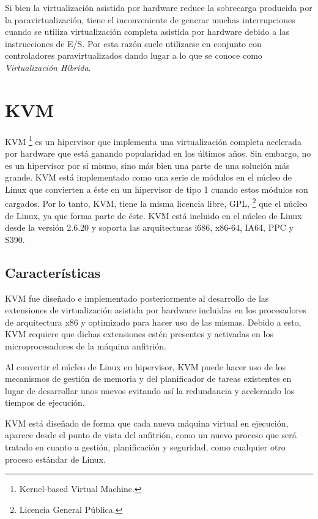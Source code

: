 \documentclass[spanisheDIVcalc,twoside,parskip-,pointlessnumbers,final]{scrbook}
\begin{document}
Si bien la virtualización asistida por hardware reduce la sobrecarga
producida por la paravirtualización, tiene el inconveniente de generar
muchas interrupciones cuando se utiliza virtualización completa asistida
por hardware debido a las instrucciones de E/S. Por esta razón suele
utilizarse en conjunto con controladores paravirtualizados dando lugar
a lo que se conoce como \emph{Virtualización Híbrida}.

 


\section{KVM}

KVM%
\footnote{Kernel-based Virtual Machine.%
} es un hipervisor que implementa una virtualización completa acelerada
por hardware que está ganando popularidad en los últimos años. Sin
embargo, no es un hipervisor por sí mismo, sino más bien una parte
de una solución más grande. KVM está implementado como una serie de
módulos en el núcleo de Linux que convierten a éste en un hipervisor
de tipo 1 cuando estos módulos son cargados. Por lo tanto, KVM, tiene
la misma licencia libre, GPL,%
\footnote{Licencia General Pública.%
} que el núcleo de Linux, ya que forma parte de éste. KVM está incluido
en el núcleo de Linux desde la versión 2.6.20 y soporta las arquitecturas
i686, x86-64, IA64, PPC y S390.


\subsection{Características}

KVM fue diseñado e implementado posteriormente al desarrollo de las
extensiones de virtualización asistida por hardware incluidas en los
procesadores de arquitectura x86 y optimizado para hacer uso de las
mismas. Debido a esto, KVM requiere que dichas extensiones estén presentes
y activadas en los microprocesadores de la máquina anfitrión.

Al convertir el núcleo de Linux en hipervisor, KVM puede hacer uso
de los mecanismos de gestión de memoria y del planificador de tareas
existentes en lugar de desarrollar unos nuevos evitando así la redundancia
y acelerando los tiempos de ejecución.

KVM está diseñado de forma que cada nueva máquina virtual en ejecución,
aparece desde el punto de vista del anfitrión, como un nuevo proceso
que será tratado en cuanto a gestión, planificación y seguridad, como
cualquier otro proceso estándar de Linux.
\end{document}
